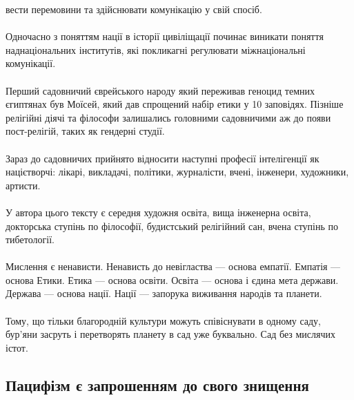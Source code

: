 вести перемовини та здійснювати комунікацію у свій спосіб.
\\
\\
Одночасно з поняттям нації в історії цивіліщації починає виникати поняття наднаціональних інститутів,
які покликагні регулювати міжнаціональні комунікації.
\\
\\
Перший садовничий єврейського народу який переживав геноцид темних єгиптянах був Моїсей, який дав спрощений набір етики у 10 заповідях.
Пізніше релігійні діячі та філософи залишались головними садовничими аж до появи пост-релігій, таких як гендерні студії.
\\
\\
Зараз до садовничих прийнято відносити наступні професії інтелігенції як націєтворчі:
лікарі, викладачі, політики, журналісти, вчені, інженери, художники, артисти.
\\
\\
У автора цього тексту є середня художня освіта, вища інженерна освіта, докторська ступінь по філософії, будистський релігійний сан,
вчена ступінь по тибетології.
\\
\\
Мислення є ненависти. Ненависть до невігластва --- основа емпатії.
Емпатія --- основа Етики.
Етика --- основа освіти.
Освіта --- основа і єдина мета держави.
Держава --- основа нації.
Нації --- запорука виживання народів та планети.
\\
\\
Тому, що тільки благородній культури можуть співіснувати в одному саду, бур'яни засруть і перетворять
планету в сад уже буквально. Сад без мислячих істот.

\subsection{Пацифізм є запрошенням до свого знищення}


